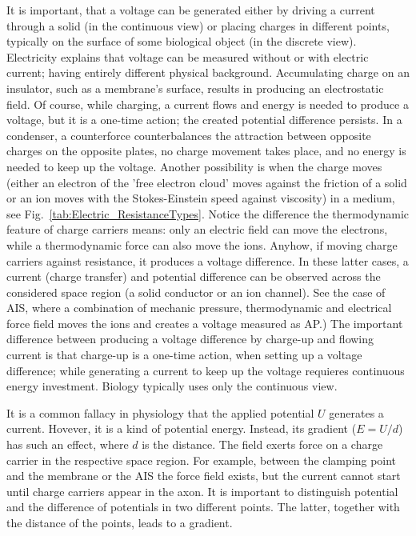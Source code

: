 It is important, that a voltage can be generated either by
driving a current through a solid (in the continuous view) or placing charges in different points, typically on the surface of some biological object (in the discrete view). Electricity explains that voltage can be measured without or with electric current; having entirely different physical background.
Accumulating charge on an insulator, such as a membrane's surface, results in producing an electrostatic field. Of course, while charging, a current flows and energy is needed to produce a voltage, but it is a one-time action; the created potential difference persists.
In a condenser, a counterforce counterbalances the attraction between opposite charges on the opposite plates, no charge movement takes place, and no energy is needed to keep up the voltage.
Another possibility 
is when the charge moves (either an electron of the 'free electron cloud' moves against the friction of a solid or an ion moves 
with the Stokes-Einstein speed against viscosity) in a medium, see Fig.~\ref{tab:Electric_ResistanceTypes}.
Notice the difference the thermodynamic feature of charge carriers
means: only an electric field can move the electrons, while a
thermodynamic force can also move the ions.
Anyhow, if moving charge carriers against resistance,
it produces a voltage difference. 
In these latter cases, a current (charge transfer) and potential difference can be observed 
across the considered space region (a solid conductor or an ion channel).  
See the case of \gls{AIS},
where a combination of mechanic pressure, thermodynamic and electrical
force field moves the ions and creates a voltage measured as \gls{AP}.)
The important difference between producing a voltage difference
by charge-up and flowing current is that charge-up is 
a one-time action, when setting up a voltage difference;
while generating a current to keep up the voltage
requieres continuous energy investment.
Biology typically uses only the continuous view.


It is a common fallacy in physiology that the applied potential $U$ generates
a current. Hovever, it is a kind of potential energy.
 Instead, its gradient ($E=U/d$) has such an effect, where $d$ is the distance. The field exerts force on a charge carrier in the respective
space region. For example, between the clamping point and the membrane or the \gls{AIS} the force field exists, but the current cannot start
until charge carriers appear in the axon. It is important to distinguish potential and the difference of potentials in two different points.
The latter, together with the distance of the points, leads to a gradient.

